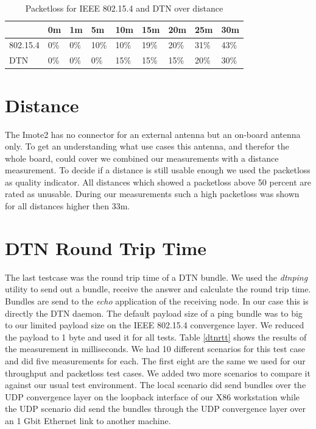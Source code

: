 \begin{table}
\begin{tabular}{lllllllll}
    & 0m & 1m & 5m & 10m & 15m & 20m & 25m & 30m \\
\hline
802.15.4 & 0\% & 0\% & 10\% & 10\% & 19\% & 20\% & 31\% & 43\% \\
DTN & 0\% & 0\% & 0\% & 15\% & 15\% & 15\% & 20\% & 30\% \\
\end{tabular}
\caption{Packetloss for IEEE 802.15.4 and DTN over distance}
\label{tableloss}
\end{table}

\section{Distance}
The Imote2 has no connector for an external antenna but an on-board antenna
only. To get an understanding what use cases this antenna, and therefor the
whole board, could cover we combined our measurements with a distance
measurement. To decide if a distance is still usable enough we used the
packetloss as quality indicator. All distances which showed a packetloss above
50 percent are rated as unusable. During our measurements such a high packetloss
was shown for all distances higher then 33m.

\section{DTN Round Trip Time}
The last testcase was the round trip time of a DTN bundle. We used the
\emph{dtnping} utility to send out a bundle, receive the answer and calculate
the round trip time. Bundles are send to the \emph{echo} application of the
receiving node. In our case this is directly the DTN daemon. The default payload
size of a ping bundle was to big to our limited payload size on the IEEE
802.15.4 convergence layer. We reduced the payload to 1 byte and used it for all
tests. Table \ref{dtnrtt} shows the results of the measurement in milliseconds. We
had 10 different scenarios for this test case and did five measurements for each.
The first eight are the same we used for our throughput and packetloss test cases.
We added two more scenarios to compare it against our usual test environment. The
local scenario did send bundles over the UDP convergence layer on the loopback
interface of our X86 workstation while the UDP scenario did send the bundles
through the UDP convergence layer over an 1 Gbit Ethernet link to another
machine.

